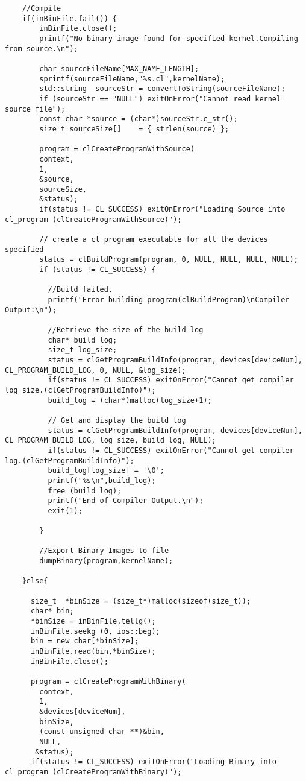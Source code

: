 \begin{verbatim}
	//Compile
	if(inBinFile.fail()) {
		inBinFile.close();	
		printf("No binary image found for specified kernel.Compiling from source.\n");
	  
		char sourceFileName[MAX_NAME_LENGTH]; 
		sprintf(sourceFileName,"%s.cl",kernelName);
		std::string  sourceStr = convertToString(sourceFileName);
		if (sourceStr == "NULL") exitOnError("Cannot read kernel source file");
		const char *source = (char*)sourceStr.c_str(); 
		size_t sourceSize[]    = { strlen(source) };

		program = clCreateProgramWithSource(
		context, 
		1, 
		&source,
		sourceSize,
		&status);
		if(status != CL_SUCCESS) exitOnError("Loading Source into cl_program (clCreateProgramWithSource)");
	
		// create a cl program executable for all the devices specified 
		status = clBuildProgram(program, 0, NULL, NULL, NULL, NULL);
		if (status != CL_SUCCESS) {
		  
		  //Build failed.
		  printf("Error building program(clBuildProgram)\nCompiler Output:\n");
		  
		  //Retrieve the size of the build log
		  char* build_log;
		  size_t log_size;
		  status = clGetProgramBuildInfo(program, devices[deviceNum], CL_PROGRAM_BUILD_LOG, 0, NULL, &log_size);
		  if(status != CL_SUCCESS) exitOnError("Cannot get compiler log size.(clGetProgramBuildInfo)");
		  build_log = (char*)malloc(log_size+1);
		  
		  // Get and display the build log
		  status = clGetProgramBuildInfo(program, devices[deviceNum], CL_PROGRAM_BUILD_LOG, log_size, build_log, NULL);
		  if(status != CL_SUCCESS) exitOnError("Cannot get compiler log.(clGetProgramBuildInfo)");
		  build_log[log_size] = '\0';
		  printf("%s\n",build_log);
		  free (build_log);
		  printf("End of Compiler Output.\n");
		  exit(1);
				  
		}

		//Export Binary Images to file
		dumpBinary(program,kernelName);
	  
	}else{
		    
	  size_t  *binSize = (size_t*)malloc(sizeof(size_t));	  
	  char* bin;  
	  *binSize = inBinFile.tellg();
	  inBinFile.seekg (0, ios::beg);
	  bin = new char[*binSize];
	  inBinFile.read(bin,*binSize);
	  inBinFile.close();
	  	  
	  program = clCreateProgramWithBinary(
	    context, 
	    1, 
	    &devices[deviceNum],
	    binSize,
	    (const unsigned char **)&bin,
	    NULL,
	   &status);
	  if(status != CL_SUCCESS) exitOnError("Loading Binary into cl_program (clCreateProgramWithBinary)");
	    

\end{verbatim}

